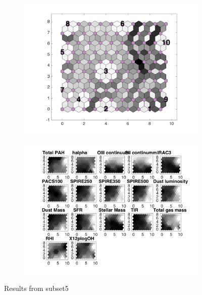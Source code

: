 \begin{figure}
    \begin{subfigure}[b]{0.5\textwidth}
        \centering
        \includegraphics[width=\textwidth]{../../images0.01/M31/2D/image_subsets/subset5_dist_with_hits_t.png}
        \label{fig: subset5_dist}
    \end{subfigure}
    \hfill
    \begin{subfigure}[b]{0.5\textwidth}
        \includegraphics[width=\textwidth]{../../images0.01/M31/2D/image_subsets/weight_planes_subset5.png}
        \label{fig: subset5_plane}
    \end{subfigure}
    \caption{Results from subset5}
    \label{fig: subset5}
\end{figure}